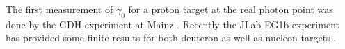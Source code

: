 The first measurement of $\gamma_0$ for a proton target at the real photon point was done by the GDH experiment at Mainz  \cite{propE03_006}.
Recently the JLab EG1b experiment has provided some finite \qsqs results for both deuteron %
as well as nucleon targets \cite{PhysRevC.92.055201}.%
\begin{comment}
Some \chipts calculations \cite{KaoPV04} \cite{BEKM13} as well as phenomenological predictions  \cite{maid07} are also available and have been used to compare with the available measurments.

\begin{figure}[h]%
  \leavevmode \texttt{[image: TexmakerMyFinTh/Chap2Theory/Figures/integralsModelsDataNoEG4Gm0LowQ2.png]} 
  \caption[Predictions for $\gamma^d_0$ and some data]{Some theoretical predictions for $\gamma^d_1$ together with the recently measured EG1b data.}
  \label{modelGm0}  
\end{figure}
	
\end{comment}
